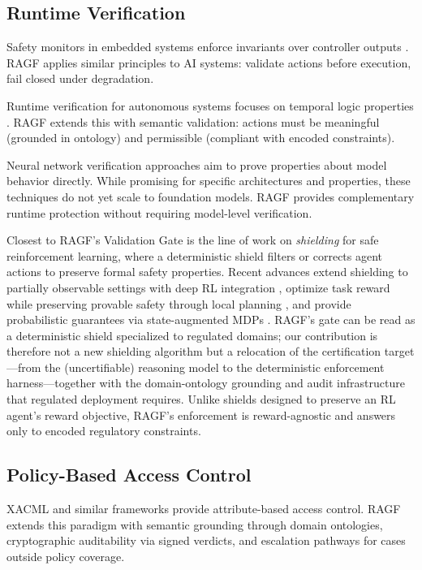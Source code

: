 \documentclass[sigconf,nonacm]{acmart}
\begin{document}
\subsection{Runtime Verification}

Safety monitors in embedded systems enforce invariants over controller outputs \cite{desai2017drona}. RAGF applies similar principles to AI systems: validate actions before execution, fail closed under degradation.

Runtime verification for autonomous systems focuses on temporal logic properties \cite{koopman2016autonomous}. RAGF extends this with semantic validation: actions must be meaningful (grounded in ontology) and permissible (compliant with encoded constraints).

Neural network verification approaches \cite{katz2017reluplex} aim to prove properties about model behavior directly. While promising for specific architectures and properties, these techniques do not yet scale to foundation models. RAGF provides complementary runtime protection without requiring model-level verification.

Closest to RAGF's Validation Gate is the line of work on \emph{shielding} for safe reinforcement learning, where a deterministic shield filters or corrects agent actions to preserve formal safety properties. Recent advances extend shielding to partially observable settings with deep RL integration \cite{carr2023shielding}, optimize task reward while preserving provable safety through local planning \cite{rahmani2024dmps}, and provide probabilistic guarantees via state-augmented MDPs \cite{hameldelacourt2025probabilistic}. RAGF's gate can be read as a deterministic shield specialized to regulated domains; our contribution is therefore not a new shielding algorithm but a relocation of the certification target---from the (uncertifiable) reasoning model to the deterministic enforcement harness---together with the domain-ontology grounding and audit infrastructure that regulated deployment requires. Unlike shields designed to preserve an RL agent's reward objective, RAGF's enforcement is reward-agnostic and answers only to encoded regulatory constraints.

\subsection{Policy-Based Access Control}

XACML and similar frameworks provide attribute-based access control. RAGF extends this paradigm with semantic grounding through domain ontologies, cryptographic auditability via signed verdicts, and escalation pathways for cases outside policy coverage.
\end{document}
